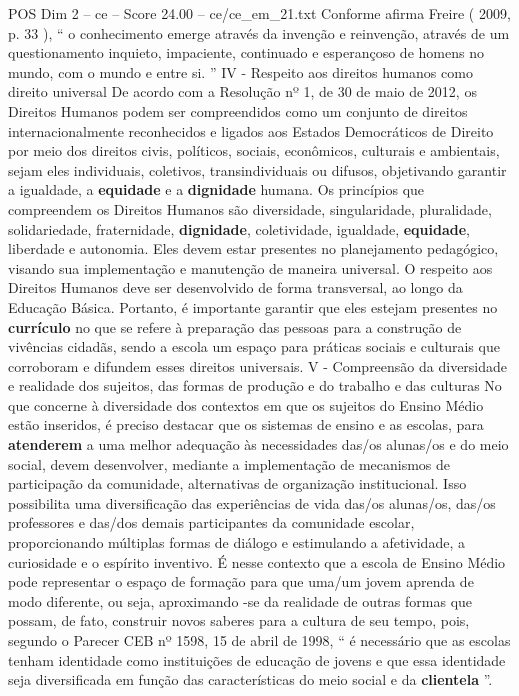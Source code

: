\begin{textsample}{POS Dim 2 – ce – Score 24.00 – ce/ce\_em\_21.txt}
Conforme afirma Freire ( 2009, p. 33 ), “ o conhecimento emerge através da invenção e reinvenção, através de um questionamento inquieto, impaciente, continuado e esperançoso de homens no mundo, com o mundo e entre si. ” IV - Respeito aos direitos humanos como direito universal De acordo com a Resolução nº 1, de 30 de maio de 2012, os Direitos Humanos podem ser compreendidos como um conjunto de direitos internacionalmente reconhecidos e ligados aos Estados Democráticos de Direito por meio dos direitos civis, políticos, sociais, econômicos, culturais e ambientais, sejam eles individuais, coletivos, transindividuais ou difusos, objetivando garantir a igualdade, a \textbf{equidade} e a \textbf{dignidade} humana.
Os princípios que compreendem os Direitos Humanos são diversidade, singularidade, pluralidade, solidariedade, fraternidade, \textbf{dignidade}, coletividade, igualdade, \textbf{equidade}, liberdade e autonomia.
Eles devem estar presentes no planejamento pedagógico, visando sua implementação e manutenção de maneira universal.
O respeito aos Direitos Humanos deve ser desenvolvido de forma transversal, ao longo da Educação Básica.
Portanto, é importante garantir que eles estejam presentes no \textbf{currículo} no que se refere à preparação das pessoas para a construção de vivências cidadãs, sendo a escola um espaço para práticas sociais e culturais que corroboram e difundem esses direitos universais.
V - Compreensão da diversidade e realidade dos sujeitos, das formas de produção e do trabalho e das culturas No que concerne à diversidade dos contextos em que os sujeitos do Ensino Médio estão inseridos, é preciso destacar que os sistemas de ensino e as escolas, para \textbf{atenderem} a uma melhor adequação às necessidades das/os alunas/os e do meio social, devem desenvolver, mediante a implementação de mecanismos de participação da comunidade, alternativas de organização institucional.
Isso possibilita uma diversificação das experiências de vida das/os alunas/os, das/os professores e das/dos demais participantes da comunidade escolar, proporcionando múltiplas formas de diálogo e estimulando a afetividade, a curiosidade e o espírito inventivo.
É nesse contexto que a escola de Ensino Médio pode representar o espaço de formação para que uma/um jovem aprenda de modo diferente, ou seja, aproximando -se da realidade de outras formas que possam, de fato, construir novos saberes para a cultura de seu tempo, pois, segundo o Parecer CEB nº 1598, 15 de abril de 1998, “ é necessário que as escolas tenham identidade como instituições de educação de jovens e que essa identidade seja diversificada em função das características do meio social e da \textbf{clientela} ”.

\end{textsample}
